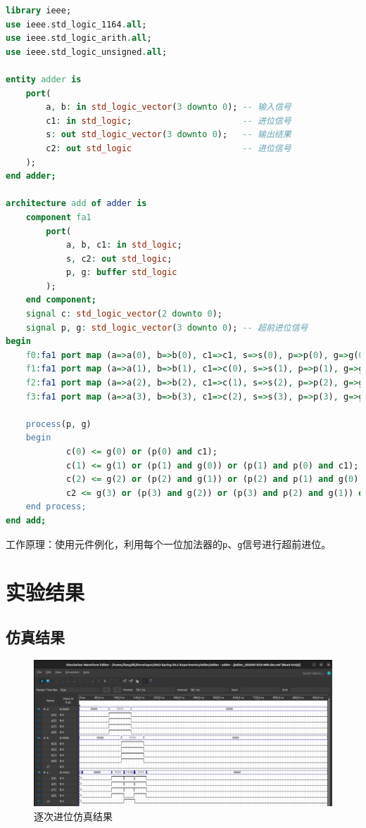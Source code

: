 \documentclass[a4paper]{article}
\begin{document}
\begin{lstlisting}[language=vhdl]
library ieee;
use ieee.std_logic_1164.all;
use ieee.std_logic_arith.all;
use ieee.std_logic_unsigned.all;

entity adder is
    port(
        a, b: in std_logic_vector(3 downto 0); -- 输入信号
        c1: in std_logic;                      -- 进位信号
        s: out std_logic_vector(3 downto 0);   -- 输出结果
        c2: out std_logic                      -- 进位信号
    );
end adder;

architecture add of adder is
    component fa1
        port(
            a, b, c1: in std_logic;
            s, c2: out std_logic;
            p, g: buffer std_logic
        );
    end component;
    signal c: std_logic_vector(2 downto 0);
    signal p, g: std_logic_vector(3 downto 0); -- 超前进位信号
begin
    f0:fa1 port map (a=>a(0), b=>b(0), c1=>c1, s=>s(0), p=>p(0), g=>g(0));
    f1:fa1 port map (a=>a(1), b=>b(1), c1=>c(0), s=>s(1), p=>p(1), g=>g(1));
    f2:fa1 port map (a=>a(2), b=>b(2), c1=>c(1), s=>s(2), p=>p(2), g=>g(2));
    f3:fa1 port map (a=>a(3), b=>b(3), c1=>c(2), s=>s(3), p=>p(3), g=>g(3));
    
    process(p, g)
    begin
            c(0) <= g(0) or (p(0) and c1);
            c(1) <= g(1) or (p(1) and g(0)) or (p(1) and p(0) and c1);
            c(2) <= g(2) or (p(2) and g(1)) or (p(2) and p(1) and g(0)) or (p(2) and p(1) and p(0) and c1);
            c2 <= g(3) or (p(3) and g(2)) or (p(3) and p(2) and g(1)) or (p(3) and p(2) and p(1) and g(0)) or (p(3) and p(2) and p(1) and p(0) and c1);
    end process;
end add;
\end{lstlisting}

工作原理：使用元件例化，利用每个一位加法器的\texttt{p}、\texttt{g}信号进行超前进位。

\section{实验结果}

\subsection{仿真结果}

\begin{figure}[H]
    \centering
    \includegraphics[width=1\textwidth]{./assets/simulation-1.png}
    \caption{逐次进位仿真结果}
\end{figure}
\end{document}
